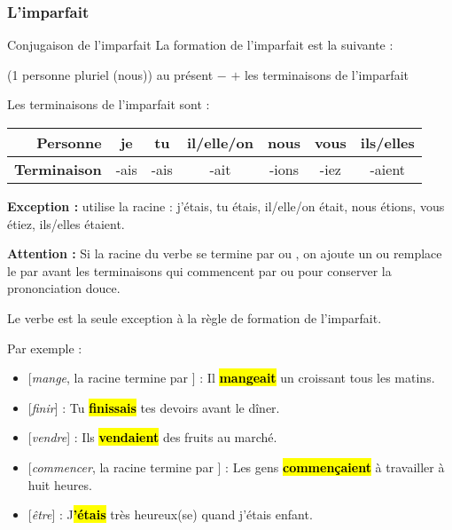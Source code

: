 \subsubsection{L'imparfait}

\begin{frbox}{Conjugaison de l'imparfait}
    La formation de l'imparfait est la suivante :

    {
        \centering
         (1\iere{} personne pluriel (nous)) au présent
        $-$  $+$ les terminaisons de l'imparfait\par
    } 

    Les terminaisons de l'imparfait sont :
    \begin{table}[H]
        \centering
        \begin{tabular}{rcccccc}
            \textbf{Personne} & je & tu & il/elle/on & nous & vous & ils/elles \\
            \hline
            \textbf{Terminaison} & -ais & -ais & -ait & -ions & -iez & -aient
        \end{tabular}
    \end{table}

    \textbf{Exception :}  utilise la racine  :
    j'étais, tu étais, il/elle/on était, nous étions, vous étiez, ils/elles étaient.

    \textbf{Attention :} Si la racine du verbe se termine par  ou ,
    on ajoute un  ou remplace le  par  avant les terminaisons
    qui commencent par  ou  pour conserver la prononciation douce.
\end{frbox}

Le verbe  est la seule exception à la règle de formation de l'imparfait.

Par exemple :
\begin{itemize}
    \item{} [\textit{mange}, la racine termine par ] : Il \hl{\textbf{mang{\color{red}e}ait}} un croissant tous les matins.
    \item{} [\textit{finir}] : Tu \hl{\textbf{finissais}} tes devoirs avant le dîner.
    \item{} [\textit{vendre}] : Ils \hl{\textbf{vendaient}} des fruits au marché.
    \item{} [\textit{commencer}, la racine termine par ] : Les gens \hl{\textbf{commen{\color{red}ç}aient}} à travailler à huit heures.
    \item{} [\textit{être}] : J\hl{\textbf{'étais}} très heureux(se) quand j'étais enfant.
\end{itemize}

